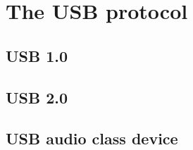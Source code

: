 \section{The USB protocol}
\subsection{USB 1.0}
\subsection{USB 2.0}
\subsection{USB audio class device}

